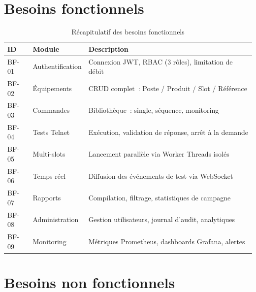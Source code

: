 \section{Besoins fonctionnels}

\begin{table}[H]
  \centering
  \caption{Récapitulatif des besoins fonctionnels}
  \label{tab:besoins_fonctionnels}
  \begin{tabular}{|C{1cm}|L{3cm}|L{9.5cm}|}
    \hline
    \textbf{ID} & \textbf{Module} & \textbf{Description} \\
    \hline
    BF-01 & Authentification &
      Connexion JWT, RBAC (3 rôles), limitation de débit \\
    \hline
    BF-02 & Équipements &
      CRUD complet~: Poste / Produit / Slot / Référence \\
    \hline
    BF-03 & Commandes &
      Bibliothèque~: single, séquence, monitoring \\
    \hline
    BF-04 & Tests Telnet &
      Exécution, validation de réponse, arrêt à la demande \\
    \hline
    BF-05 & Multi-slots &
      Lancement parallèle via Worker Threads isolés \\
    \hline
    BF-06 & Temps réel &
      Diffusion des événements de test via WebSocket \\
    \hline
    BF-07 & Rapports &
      Compilation, filtrage, statistiques de campagne \\
    \hline
    BF-08 & Administration &
      Gestion utilisateurs, journal d'audit, analytiques \\
    \hline
    BF-09 & Monitoring &
      Métriques Prometheus, dashboards Grafana, alertes \\
    \hline
  \end{tabular}
\end{table}

\section{Besoins non fonctionnels}

